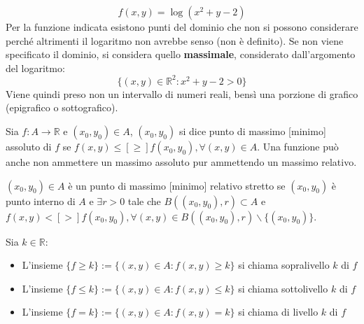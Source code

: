 \begin{example}
	\begin{equation*}
		f(x, y)=\log(x^2+y-2)
	\end{equation*}	
	Per la funzione indicata esistono punti del dominio che non si possono considerare perché altrimenti il logaritmo non avrebbe senso (non è definito). Se non viene specificato il dominio, si considera quello \textbf{massimale}, considerato dall'argomento del logaritmo:
	\begin{equation*}
		\{(x, y)\in \mathbb{R}^2 : x^2+y-2>0\}
	\end{equation*}
	Viene quindi preso non un intervallo di numeri reali, bensì una porzione di grafico (epigrafico o sottografico).
\end{example}

\begin{definition}
	Sia $f:A\rightarrow\mathbb{R}$ e $(x_0, y_0)\in A$, $(x_0, y_0)$ si dice punto di massimo [minimo] assoluto di $f$ se $f(x, y)\leq [\geq]f(x_0, y_0), \forall (x, y)\in A$. Una funzione può anche non ammettere un massimo assoluto pur ammettendo un massimo relativo.
\end{definition}

\begin{definition}
	$(x_0, y_0)\in A$ è un punto di massimo [minimo] relativo stretto se $(x_0, y_0)$ è punto interno di $A$ e $\exists r>0$ tale che $B((x_0, y_0), r)\subset A$ e $f(x, y)<[>]f(x_0, y_0), \forall (x, y)\in B((x_0, y_0), r) \backslash\{(x_0, y_0)\}$.
\end{definition}

\begin{definition}
	Sia $k\in \mathbb{R}$:
	\begin{itemize}
		\item L'insieme $\{f\geq k\} := \{(x, y)\in A : f(x, y)\geq k\}$ si chiama sopralivello $k$ di $f$
		\item L'insieme $\{f\leq k\} := \{(x, y)\in A : f(x, y)\leq k\}$ si chiama sottolivello $k$ di $f$
		\item L'insieme $\{f= k\} := \{(x, y)\in A : f(x, y)= k\}$ si chiama di livello $k$ di $f$
	\end{itemize}
	
\end{definition}

